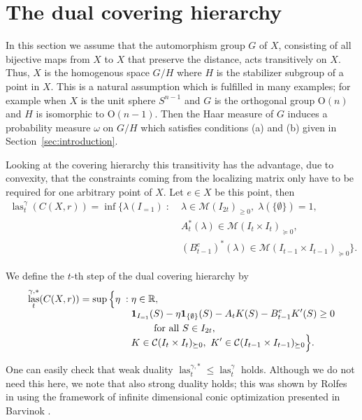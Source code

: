 \documentclass{amsart}
\newcommand{\R}{\mathbb{R}}
\newcommand{\Ccal}{\mathcal{C}}
\DeclareMathOperator{\las}{las}
\begin{document}
%
%
%

\section{The dual covering hierarchy}
\label{sec:dual-covering-hierarchy}

In this section we assume that the automorphism group $G$ of $X$, consisting of all bijective maps from $X$ to $X$ that preserve the distance,
acts transitively on $X$. Thus,  $X$ is the homogenous space $G/H$ where
$H$ is the stabilizer subgroup of a point in $X$. This is a natural
assumption which is fulfilled in many examples; for example when $X$
is the unit sphere $S^{n-1}$ and $G$ is the orthogonal group
$\mathrm{O}(n)$ and $H$ is  isomorphic to $\mathrm{O}(n-1)$. Then the
Haar measure of $G$ induces a probability measure $\omega$ on $G/H$
which satisfies conditions (a) and (b) given in Section~\ref{sec:introduction}.

Looking at the covering hierarchy this transitivity has the advantage, due to
convexity, that the constraints coming from the localizing matrix only
have to be required for one arbitrary point of $X$. Let $e \in X$ be this
point, then
\[
  \begin{split}
  \las^\gamma_t(C(X,r)) = \inf\Big\{\lambda(I_{=1})   \; : \; & \lambda \in \mathcal{M}(I_{2t})_{\geq 0}, \;
\lambda(\{\emptyset\}) = 1,\\
& A_t^*(\lambda) \in \mathcal{M}(I_t \times I_t)_{\succeq 0}, \\
& (B^e_{t-1})^*(\lambda) \in  \mathcal{M}(I_{t-1} \times
I_{t-1})_{\succeq 0} \Big\}.
\end{split}
\]

We define the $t$-th step of the dual covering hierarchy by
\[
\begin{split}\label{dual_hierarchy}
\las^{\gamma,*}_t(C(X,r)) = \sup\Big\{ \eta \; : \; & \eta \in \R,\\[-1ex]
& \mathbf{1}_{I_{=1}}(S)- \eta\mathbf{1}_{\{\emptyset\}}(S)\notag  -A_t
K(S) - B_{t-1}^e K'(S) \geq 0\\
& \qquad \text{ for all } S\in I_{2t}, \\[-1ex]
&  K\in \Ccal (I_t \times I_t)_{\succeq 0},\ K'\in \mathcal{C} (I_{t-1} \times I_{t-1})_{\succeq 0} \Big\}.
\end{split}
\]

One can easily check that weak duality $\las^{\gamma,*}_t \leq \las^{\gamma}_t$
holds.  Although we do not need this here, we note that also strong
duality holds; this was shown by Rolfes in \cite{Rolfes-2019} using
the framework of infinite dimensional conic optimization presented in
Barvinok \cite[Chapter IV]{Barvinok-2002}.
\end{document}
